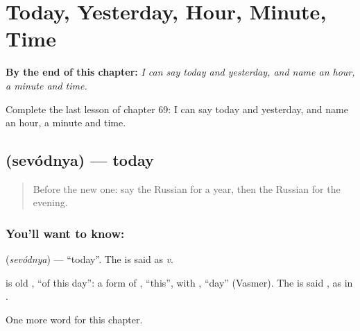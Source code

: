 
\chapter{Today, Yesterday, Hour, Minute, Time}
\label{ch:ru-today-yesterday-hour-minute-time}

\begin{chapteropening}
\textbf{By the end of this chapter:} \emph{I can say today and yesterday, and name an hour, a minute and time.}

Complete the last lesson of chapter 69: I can say today and yesterday, and name an hour, a minute and time.
\end{chapteropening}

\section[\texorpdfstring{\ru{сегодня} (sevódnya)}{сегодня (sevódnya)}]{ (sevódnya) — today}

\label{lesson:RU-C69-today}



\begin{quote}
Before the new one: say the Russian for a year, then the Russian for the evening.
\end{quote}

\subsection*{You'll want to know: }
\textbf{} (\emph{sevódnya}) — \textquotedblleft{}today\textquotedblright{}. The \textbf{} is said as \emph{v}.

\begin{cousinweb}
\textbf{} is old \emph{ }, \textquotedblleft{}of this day\textquotedblright{}: a form of \emph{}, \textquotedblleft{}this\textquotedblright{}, with \emph{}, \textquotedblleft{}day\textquotedblright{} (Vasmer). The \emph{} is said \emph{}, as in \emph{}.
\end{cousinweb}

\begin{grammarlens}[title={What you've built}]
One more word for this chapter.
\end{grammarlens}

